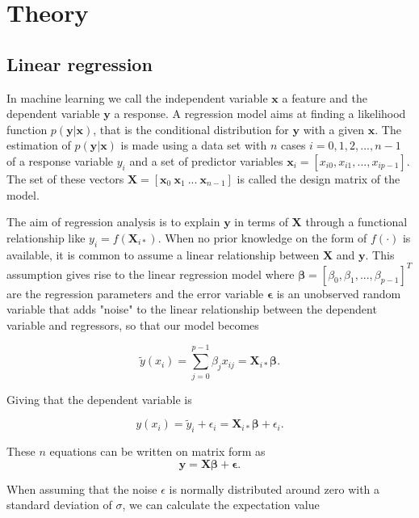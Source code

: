 
\section{Theory}
\subsection{Linear regression}
In machine learning we call the independent variable $\mathbf{x}$ a feature and the dependent variable $\mathbf{y}$ a response. A regression model aims at finding a likelihood function $p(\mathbf{y}|\mathbf{x})$, that is the conditional distribution for $\mathbf{y}$ with a given $\mathbf{x}$. The estimation of $p(\mathbf{y}|\mathbf{x})$ is made using a data set with $n$ cases $i=0,1,2,...,n-1$ of a response variable $y_i$ and a set of predictor variables $\mathbf{x}_i=[x_{i0}, x_{i1},...,x_{ip-1}]$. The set of these vectors $\mathbf{X}=[\mathbf{x}_{0}\ \mathbf{x}_{1}\ ...\ \mathbf{x}_{n-1}]$ is called the design matrix of the model. 


The aim of regression analysis is to explain $\mathbf y$ in terms of $\mathbf X$ through a functional relationship like $y_i=f(\mathbf{X}_{i*})$. When no prior knowledge on the form of $f( \cdot )$ is available, it is common to assume a linear relationship between $\mathbf{X}$ and $\mathbf{y}$. This assumption gives rise to the linear regression model where $\boldsymbol\beta=\left[\beta_0, \beta_1, ..., \beta_{p-1} \right]^T$ are the regression parameters and the error variable $\boldsymbol\epsilon$ is an unobserved random variable that adds "noise" to the linear relationship between the dependent variable and regressors, so that our model becomes

$$
\tilde{y}(x_i) = \sum_{j=0}^{p-1} \beta_j x_{ij}=\mathbf X_{i*}\boldsymbol{\beta}.
$$

Giving that the dependent variable is

$$
y(x_i) = \tilde{y}_i + \epsilon_i = \mathbf X_{i*}\boldsymbol{\beta} + \epsilon_i.
$$

These $n$ equations can be written on matrix form as
\begin{equation}\label{eq:linear_regression}
    \mathbf{y} = \mathbf{X}\boldsymbol{\beta} + \boldsymbol{\epsilon}.
\end{equation}

When assuming that the noise $\epsilon$ is normally distributed around zero with a standard deviation of $\sigma$, we can calculate the expectation value

